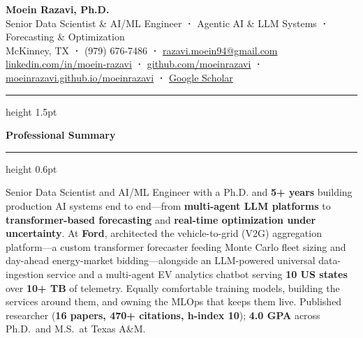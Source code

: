 \documentclass[10pt,letterpaper]{article}
\newcommand{\cvsection}[1]{%
  \vspace{0.2em}%
  {\color{headerblue}\large\bfseries #1}%
  \vspace{0.06em}%
  {\color{goldaccent}\hrule height 0.6pt}%
  \vspace{0.2em}%
}
\begin{document}
\begin{center}
  {\fontsize{20}{24}\selectfont\bfseries\color{headerblue}Moein Razavi, Ph.D.}\\[0.2em]
  {\large\color{darktext}
    Senior Data Scientist \& AI/ML Engineer\enspace
    {\color{goldaccent}\textbf{·}}\enspace
    Agentic AI \& LLM Systems\enspace
    {\color{goldaccent}\textbf{·}}\enspace
    Forecasting \& Optimization
  }\\[0.3em]
  {\color{graytext}
    McKinney, TX\enspace
    {\color{goldaccent}\textbf{·}}\enspace
    (979) 676-7486\enspace
    {\color{goldaccent}\textbf{·}}\enspace
    \href{mailto:razavi.moein94@gmail.com}{razavi.moein94@gmail.com}
  }\\[0.15em]
  {\color{graytext}
    \href{https://linkedin.com/in/moein-razavi}{linkedin.com/in/moein-razavi}\enspace
    {\color{goldaccent}\textbf{·}}\enspace
    \href{https://github.com/moeinrazavi}{github.com/moeinrazavi}\enspace
    {\color{goldaccent}\textbf{·}}\enspace
    \href{https://moeinrazavi.github.io/moeinrazavi/}{moeinrazavi.github.io/moeinrazavi}\enspace
    {\color{goldaccent}\textbf{·}}\enspace
    {\color{accentcolor}\href{https://scholar.google.com/citations?user=wj_qWaQAAAAJ}{Google Scholar}}
  }
\end{center}

\vspace{0.12em}
{\color{goldaccent}\hrule height 1.5pt}
\vspace{0.22em}

\cvsection{Professional Summary}

{\color{darktext}
Senior Data Scientist and AI/ML Engineer with a Ph.D. and \textbf{5+ years} building production AI systems end to end---from \textbf{multi-agent LLM platforms} to \textbf{transformer-based forecasting} and \textbf{real-time optimization under uncertainty}. At \textbf{Ford}, architected the vehicle-to-grid (V2G) aggregation platform---a custom transformer forecaster feeding Monte Carlo fleet sizing and day-ahead energy-market bidding---alongside an LLM-powered universal data-ingestion service and a multi-agent EV analytics chatbot serving \textbf{10 US states} over \textbf{10+ TB} of telemetry. Equally comfortable training models, building the services around them, and owning the MLOps that keeps them live. Published researcher (\textbf{16 papers, 470+ citations, h-index 10}); \textbf{4.0 GPA} across Ph.D.\ and M.S.\ at Texas A\&M.
}
\end{document}
